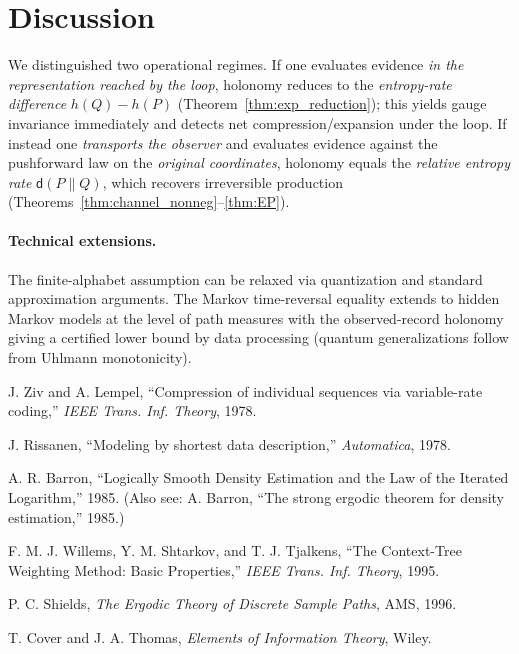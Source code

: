 \documentclass[11pt]{article}
\newcommand{\1}{\mathbbm{1}}
\begin{document}
\section*{Discussion}
We distinguished two operational regimes.
If one evaluates evidence \emph{in the representation reached by the loop}, holonomy reduces to the \emph{entropy-rate difference} $h(Q)-h(P)$ (Theorem~\ref{thm:exp_reduction}); this yields gauge invariance immediately and detects net compression/expansion under the loop.
If instead one \emph{transports the observer} and evaluates evidence against the pushforward law on the \emph{original coordinates}, holonomy equals the \emph{relative entropy rate} $\mathsf{d}(P\|Q)$, which recovers irreversible production (Theorems~\ref{thm:channel_nonneg}--\ref{thm:EP}).

\paragraph{Technical extensions.} The finite-alphabet assumption can be relaxed via quantization and standard approximation arguments. The Markov time-reversal equality extends to hidden Markov models at the level of path measures with the observed-record holonomy giving a certified lower bound by data processing (quantum generalizations follow from Uhlmann monotonicity).

\begin{thebibliography}{9}
J. Ziv and A. Lempel, ``Compression of individual sequences via variable-rate coding,'' \emph{IEEE Trans. Inf. Theory}, 1978.

J. Rissanen, ``Modeling by shortest data description,'' \emph{Automatica}, 1978.

A. R. Barron, ``Logically Smooth Density Estimation and the Law of the Iterated Logarithm,'' 1985. (Also see: A. Barron, ``The strong ergodic theorem for density estimation,'' 1985.)

F. M. J. Willems, Y. M. Shtarkov, and T. J. Tjalkens, ``The Context-Tree Weighting Method: Basic Properties,'' \emph{IEEE Trans. Inf. Theory}, 1995.

P. C. Shields, \emph{The Ergodic Theory of Discrete Sample Paths}, AMS, 1996.

T. Cover and J. A. Thomas, \emph{Elements of Information Theory}, Wiley.
\end{thebibliography}
\end{document}
